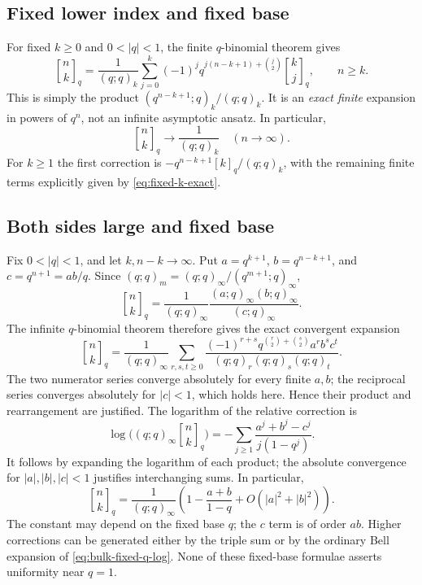 \documentclass[11pt,a4paper]{article}
\numberwithin{equation}{section}
\theoremstyle{definition}
\theoremstyle{remark}
\newcommand{\G}[2]{\genfrac{[}{]}{0pt}{}{#1}{#2}_{q}}
\begin{document}
\subsection{Fixed lower index and fixed base}
For fixed $k\ge0$ and $0<|q|<1$, the finite $q$-binomial theorem gives
\begin{equation}
 \boxed{\displaystyle
 \G nk=\frac1{(q;q)_k}
      \sum_{j=0}^k(-1)^jq^{j(n-k+1)+\binom j2}\G kj,
       \qquad n\ge k.}
 \label{eq:fixed-k-exact}
\end{equation}
This is simply the product
$(q^{n-k+1};q)_k/(q;q)_k$. It is an \emph{exact finite} expansion in
powers of $q^n$, not an infinite asymptotic ansatz. In particular,
\[
 \G nk\longrightarrow\frac1{(q;q)_k}\quad(n\to\infty).
\]
For $k\ge1$ the first correction is
$-q^{n-k+1}[k]_q/(q;q)_k$, with the remaining finite terms explicitly
given by \cref{eq:fixed-k-exact}.

\subsection{Both sides large and fixed base}
Fix $0<|q|<1$, and let $k,n-k\to\infty$. Put
$a=q^{k+1}$, $b=q^{n-k+1}$, and $c=q^{n+1}=ab/q$.
Since $(q;q)_m=(q;q)_\infty/(q^{m+1};q)_\infty$,
\begin{equation}
 \G nk=\frac1{(q;q)_\infty}
              \frac{(a;q)_\infty(b;q)_\infty}{(c;q)_\infty}.
 \label{eq:bulk-fixed-q-product}
\end{equation}
The infinite $q$-binomial theorem therefore gives the exact convergent
expansion
\begin{equation}
 \G nk=\frac1{(q;q)_\infty}
 \sum_{r,s,t\ge0}
   \frac{(-1)^{r+s}q^{\binom r2+\binom s2}a^rb^sc^t}
        {(q;q)_r(q;q)_s(q;q)_t}.
 \label{eq:bulk-fixed-q-triple}
\end{equation}
The two numerator series converge absolutely for every finite $a,b$;
the reciprocal series converges absolutely for $|c|<1$, which holds
here. Hence their product and rearrangement are justified.
The logarithm of the relative correction is
\begin{equation}
 \log\bigl((q;q)_\infty\G nk\bigr)
   =-\sum_{j\ge1}\frac{a^j+b^j-c^j}{j(1-q^j)}.
 \label{eq:bulk-fixed-q-log}
\end{equation}
It follows by expanding the logarithm of each product; the absolute
convergence for $|a|,|b|,|c|<1$ justifies interchanging sums. In
particular,
\begin{equation}
 \G nk=\frac1{(q;q)_\infty}
       \left(1-\frac{a+b}{1-q}
                       +O(|a|^2+|b|^2)\right).
 \label{eq:bulk-fixed-q-leading}
\end{equation}
The constant may depend on the fixed base $q$; the $c$ term is of order
$ab$. Higher corrections can be generated either by the triple sum or
by the ordinary Bell expansion of \cref{eq:bulk-fixed-q-log}. None of
these fixed-base formulae asserts uniformity near $q=1$.
\end{document}
